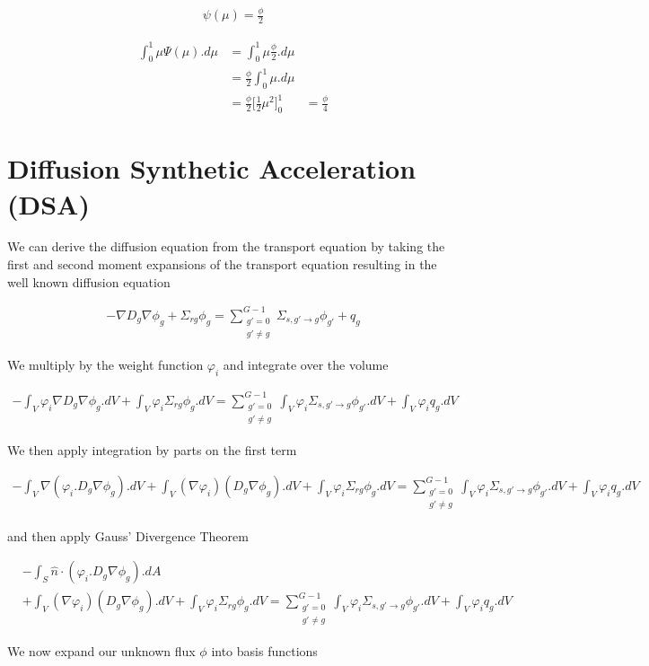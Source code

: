 \documentclass[11pt,letterpaper,titlepage]{article}
\numberwithin{equation}{section}
\newcommand{\beq}{\begin{equation*}
\begin{aligned}}
\newcommand{\eeq}{\end{aligned}
\end{equation*}}
\newcommand{\beqn}{\begin{equation}
	\begin{aligned}}
\newcommand{\eeqn}{\end{aligned}
	\end{equation}}
\begin{document}
\beq
\psi(\mu) = \frac{\phi}{2}
\eeq 

\beq
\int_{0}^{1} \mu \Psi(\mu).d\mu &= \int_{0}^{1} \mu \frac{\phi}{2} .d\mu \\
&= \frac{\phi}{2} \int_{0}^{1} \mu.d\mu \\
&= \frac{\phi}{2} \biggr[ \frac{1}{2}\mu^2 \biggr]_{0}^{1}
&= \frac{\phi}{4}
\eeq 






\newpage
\section{Diffusion Synthetic Acceleration (DSA)}
We can derive the diffusion equation from the transport equation by taking the first and second moment expansions of the transport equation resulting in the well known diffusion equation

\beqn \label{eq:diffusionEquation}
-\nabla D_g \nabla \phi_g+ \Sigma_{rg} \phi_g = 
\sum_{\substack{g'=0 \\ g'\ne g}}^{G-1} \Sigma_{s,g' \to g} \phi_{g'} + q_g
\eeqn 

We multiply by the weight function $\varphi_i$ and integrate over the volume 

\beq
-\int_V \varphi_i \nabla D_g \nabla \phi_g.dV+ \int_V \varphi_i \Sigma_{rg} \phi_g.dV = 
\sum_{\substack{g'=0 \\ g'\ne g}}^{G-1} \int_V \varphi_i \Sigma_{s,g' \to g} \phi_{g'}.dV + \int_V \varphi_i q_g.dV
\eeq

We then apply integration by parts on the first term

\beq
-\int_V \nabla (\varphi_i. D_g \nabla \phi_g).dV + \int_V ( \nabla \varphi_i ) (D_g \nabla \phi_g).dV
+ \int_V \varphi_i \Sigma_{rg} \phi_g.dV = 
\sum_{\substack{g'=0 \\ g'\ne g}}^{G-1} \int_V \varphi_i \Sigma_{s,g' \to g} \phi_{g'}.dV + \int_V \varphi_i q_g.dV
\eeq

and then apply Gauss' Divergence Theorem

\beqn \label{eq:diffusionbeforebasis}
&-\int_S \hat{n} \cdot (\varphi_i. D_g \nabla \phi_g).dA \\
&+ \int_V ( \nabla \varphi_i ) (D_g \nabla \phi_g).dV
+ \int_V \varphi_i \Sigma_{rg} \phi_g.dV = 
\sum_{\substack{g'=0 \\ g'\ne g}}^{G-1} \int_V \varphi_i \Sigma_{s,g' \to g} \phi_{g'}.dV + \int_V \varphi_i q_g.dV
\eeqn

We now expand our unknown flux $\phi$ into basis functions
\end{document}
